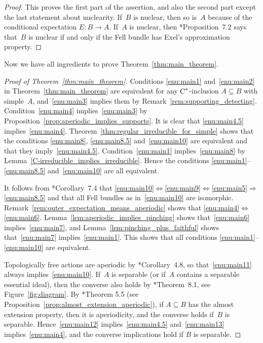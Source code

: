 \documentclass[a4paper]{amsart}
\theoremstyle{plain}
\theoremstyle{definition}
\theoremstyle{remark}
\numberwithin{theorem}{section}
\numberwithin{equation}{section}
\newcommand*{\nb}{\nobreakdash}
\newcommand*{\Cst}{\textup C^*}%
\begin{document}
\begin{proof}
  This proves the first part of the assertion, and also the second part except
  the last statement about nuclearity. If~\(B\) is nuclear, then so is~\(A\) because of the conditional
  expectation \(E\colon B\to A\).
  If~\(A\) is nuclear, then
  \cite{Abadie-Buss-Ferraro:Amenability}*{Proposition~7.2} says
  that~\(B\) is nuclear if and only if the Fell bundle has Exel's
  approximation property.
\end{proof}

Now we have all ingredients to prove Theorem~\ref{thm:main_theorem}.

\begin{proof}[Proof of Theorem~\ref{thm:main_theorem}]
  \label{proof:main_theorem}
  Conditions \ref{enu:main1} and~\ref{enu:main2} in
  Theorem~\ref{thm:main_theorem} are equivalent for any
  \(\Cst\)\nb-inclusion \(A\subseteq B\) with simple~\(A\),
  and~\ref{enu:main3} implies them by
  Remark~\ref{rem:supporting_detecting}.
  Condition~\ref{enu:main4} implies~\ref{enu:main3} by
  Proposition~\ref{prop:aperiodic_implies_supports}.
  It is clear that \ref{enu:main4.5} implies~\ref{enu:main4}.
  Theorem~\ref{thm:regular_irreducible_for_simple} shows that the
  conditions \ref{enu:main8}, \ref{enu:main8.5} and~\ref{enu:main10}
  are equivalent and that they imply~\ref{enu:main4.5}.
  Condition~\ref{enu:main1} implies~\ref{enu:main8} by
  Lemma~\ref{C-irreducible_implies_irreducible}.
  Hence the conditions \ref{enu:main1}--\ref{enu:main8.5}
  and~\ref{enu:main10} are all equivalent.
	
  It follows from \cite{Kwasniewski-Meyer:Cartan}*{Corollary~7.4} that
  \ref{enu:main10}\(\Leftrightarrow
  \)\ref{enu:main9}\(\Leftrightarrow
  \)\ref{enu:main5}\(\Rightarrow
  \)\ref{enu:main8.5} and that all Fell bundles as in~\ref{enu:main10}
  are isomorphic.
  Remark~\ref{rem:outer_expectation_means_aperiodic} shows that
  \ref{enu:main4}\(\Leftrightarrow
  \)\ref{enu:main6}.
  Lemma~\ref{lem:aperiodic_implies_pinching} shows
  that~\ref{enu:main6} implies~\ref{enu:main7},
  and Lemma~\ref{lem:pinching_plus_faithful} shows that~\ref{enu:main7}
  implies~\ref{enu:main1}.
  This shows that all conditions \ref{enu:main1}--\ref{enu:main10} are
  equivalent.

  Topologically free actions are aperiodic by
  \cite{Kwasniewski-Meyer:Aperiodicity_pseudo_expectations}*{Corollary~4.8},
  so that~\ref{enu:main11} always implies~\ref{enu:main10}.
  If~\(A\) is separable (or if~\(A\) contains a separable essential ideal),
  then the converse also holds by
  \cite{Kwasniewski-Meyer:Aperiodicity}*{Theorem~8.1}, see
  Figure~\ref{fig:diagram}.
  By
  \cite{Kwasniewski-Meyer:Aperiodicity_pseudo_expectations}*{Theorem
    5.5} (see Proposition~\ref{prop:almost_extension_aperiodic}), if
  \(A\subseteq B\) has the almost extension property, then it is
  aperiodicity, and the converse holds if~\(B\) is separable.
  Hence~\ref{enu:main12} implies~\ref{enu:main4.5}
  and~\ref{enu:main13} implies~\ref{enu:main4}, and the converse
  implications hold if \(B\) is separable.
\end{proof}
\end{document}
